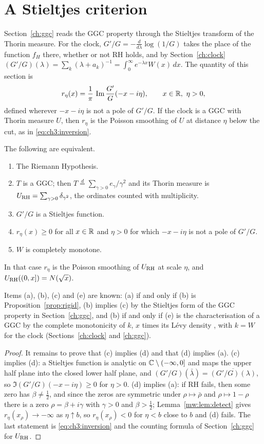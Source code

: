 \section{A Stieltjes criterion}\label{mw:sec:stieltjes}

Section~\ref{ch:ggc} reads the GGC property through the Stieltjes transform of the Thorin measure. For the clock, $G'/G=-\frac d{d\lambda}\log(1/G)$ takes the place of the function $f_H$ there, whether or not RH holds, and by Section~\ref{ch:clock} $(G'/G)(\lambda)=\sum_k(\lambda+a_k)^{-1}=\int_0^\infty e^{-\lambda x}W(x)\,dx$. The quantity of this section is
\[
r_\eta(x)=\frac1\pi\,\operatorname{Im}\frac{G'}{G}(-x-i\eta),\qquad x\in\mathbb{R},\ \eta>0,
\]
defined wherever $-x-i\eta$ is not a pole of $G'/G$. If the clock is a GGC with Thorin measure $U$, then $r_\eta$ is the Poisson smoothing of $U$ at distance $\eta$ below the cut, as in \eqref{eq:ch3:inversion}.

\begin{theorem}\label{mw:thm:stieltjes}
The following are equivalent.
\begin{enumerate}
\item[(a)] The Riemann Hypothesis.
\item[(b)] $T$ is a GGC; then $T\stackrel{d}{=}\sum_{\gamma>0}e_\gamma/\gamma^2$ and its Thorin measure is $U_{\mathrm{RH}}=\sum_{\gamma>0}\delta_{\gamma^2}$, the ordinates counted with multiplicity.
\item[(c)] $G'/G$ is a Stieltjes function.
\item[(d)] $r_\eta(x)\ge0$ for all $x\in\mathbb{R}$ and $\eta>0$ for which $-x-i\eta$ is not a pole of $G'/G$.
\item[(e)] $W$ is completely monotone.
\end{enumerate}
In that case $r_\eta$ is the Poisson smoothing of $U_{\mathrm{RH}}$ at scale $\eta$, and $U_{\mathrm{RH}}((0,x])=N(\sqrt x)$.
\end{theorem}

Items (a), (b), (c) and (e) are known: (a) if and only if (b) is Proposition~\ref{prop:rigid}, (b) implies (c) by the Stieltjes form of the GGC property in Section~\ref{ch:ggc}, and (b) if and only if (e) is the characterisation of a GGC by the complete monotonicity of $k$, $x$ times its L\'evy density \cite{Bondesson}, with $k=W$ for the clock (Sections~\ref{ch:clock} and \ref{ch:ggc}).

\begin{proof}
It remains to prove that (c) implies (d) and that (d) implies (a). (c) implies (d): a Stieltjes function is analytic on $\mathbb{C}\setminus(-\infty,0]$ and maps the upper half plane into the closed lower half plane, and $(G'/G)(\bar\lambda)=\overline{(G'/G)(\lambda)}$, so $\Im(G'/G)(-x-i\eta)\ge0$ for $\eta>0$. (d) implies (a): if RH fails, then some zero has $\beta\ne\frac12$, and since the zeros are symmetric under $\rho\mapsto\bar\rho$ and $\rho\mapsto1-\rho$ there is a zero $\rho=\beta+i\gamma$ with $\gamma>0$ and $\beta>\frac12$; Lemma~\ref{mw:lem:detect} gives $r_\eta(x_\rho)\to-\infty$ as $\eta\uparrow b$, so $r_\eta(x_\rho)<0$ for $\eta<b$ close to $b$ and (d) fails. The last statement is \eqref{eq:ch3:inversion} and the counting formula of Section~\ref{ch:ggc} for $U_{\mathrm{RH}}$.
\end{proof}

